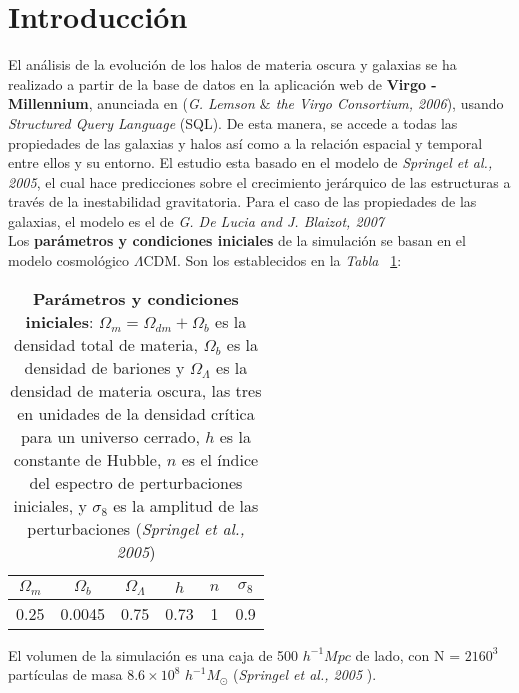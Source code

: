 \section{Introducción} 
\label{sec:1} %

El análisis de la evolución de los halos de materia oscura y galaxias se ha realizado a partir de la base de datos en la aplicación web de \textbf{Virgo - Millennium}\cite{6}, anunciada en (\textit{G. Lemson $\&$ the Virgo Consortium, 2006}\cite{5}), usando \textit{Structured Query Language} (SQL). De esta manera, se accede a todas las propiedades de las galaxias y halos así como a la relación espacial y temporal entre ellos y su entorno. El estudio esta basado en el modelo de \textit{Springel et al., 2005}\cite{1}, el cual hace predicciones sobre el crecimiento jerárquico de las estructuras a través de la inestabilidad gravitatoria. Para el caso de las propiedades de las galaxias, el modelo es el de \textit{G. De Lucia and J. Blaizot, 2007}\cite{2}\\ 

 Los \textbf{parámetros y condiciones iniciales} de la simulación se basan en el modelo cosmológico $\Lambda$CDM. Son los establecidos en la \textit{Tabla} ~\ref{tab:tabla1}: 
 
\begin{table}[H]
\begin{center}
\begin{tabular}{c|c|c|c|c|c}
\toprule
\cellcolor[gray]{0.9}\large{$\Omega_m$} & \cellcolor[gray]{0.9}\large{$\Omega_b$} & \cellcolor[gray]{0.9}\large{$\Omega_\Lambda$} & \cellcolor[gray]{0.9}\large{$h$} & \cellcolor[gray]{0.9}\large{$n$}& \cellcolor[gray]{0.9}\large{$\sigma_8$}\\
\midrule
0.25 & 0.0045 & 0.75 & 0.73 & 1 & 0.9 \\
\bottomrule
\end{tabular}
\end{center}
\caption{\textbf{Parámetros y condiciones iniciales}: $\Omega_m = \Omega_{dm} + \Omega_b$ es la densidad total de materia, $\Omega_b$ es la densidad de bariones y $\Omega_\Lambda$ es la densidad de materia oscura, las tres en unidades de la densidad crítica para un universo cerrado, $h$ es la constante de Hubble, $n$ es el índice del espectro de perturbaciones iniciales, y $\sigma_8$ es la amplitud de las perturbaciones (\textit{Springel et al., 2005}\cite{1})}
\label{tab:tabla1}
\end{table}

El volumen de la simulación es una caja de 500 $h^{-1}Mpc$ de lado, con N = $2160^{3}$ partículas de masa $8.6\times 10^8$ $h^{-1}M_\odot$ (\textit{Springel et al., 2005}\cite{1} \cite{7}). \\

